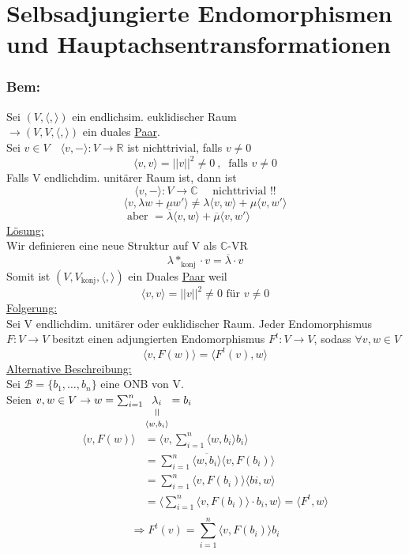 \documentclass[titlepage,12pt,a4paper,ngerman]{report}
\newcommand{\verteq}{\rotatebox{90}{$\,=$}}
\newcommand{\equalto}[2]{\underset{\scriptstyle\overset{\mkern4mu\verteq}{#2}}{#1}}
\newcommand{\tx}[1]{\textrm{#1}}
\begin{document}
\section{Selbsadjungierte Endomorphismen und Hauptachsentransformationen}
\subsubsection{Bem:}
Sei $ (V, \langle , \rangle) $ ein endlichsim. euklidischer Raum\\
$ \rightarrow (V,V,\langle,\rangle)$ ein duales \underline{Paar}.\\
Sei $ v\in V \quad \langle v, - \rangle : V \to \mathbb{R} $ ist nichttrivial, falls $ v \neq 0 $
$$ \langle v,v \rangle = ||v||^2 \neq 0\ , \ \tx{ falls } v \neq 0$$
Falls V endlichdim. unitärer Raum ist, dann ist 
$$ \langle v,-\rangle : V \to \mathbb{C} \quad \tx{ nichttrivial !!} $$
$$ \langle v, \lambda w + \mu w' \rangle \neq \lambda \langle v,w \rangle + \mu \langle v, w' \rangle$$
$$ \tx{aber } = \overline{\lambda} \langle v,w \rangle + \overline{\mu} \langle v, w'\rangle \qquad \quad $$
\underline{Lösung:}\\
Wir definieren eine neue Struktur auf V als $ \mathbb{C} $-VR
$$ \lambda *_{\tx{konj}} \cdot v = \overline{\lambda} \cdot v $$
Somit ist $ (V,V_{\tx{konj}}, \langle,\rangle) $ ein Duales \underline{Paar} weil 
$$ \langle v,v \rangle = ||v||^2 \neq 0 \tx{ für } v \neq 0$$
\underline{Folgerung:}\\
Sei V endlichdim. unitärer oder euklidischer Raum. Jeder Endomorphismus $ F: V \to V $ besitzt einen adjungierten Endomorphismus $ F^t: V \to V $, sodass $ \forall v,w \in V  $\\
$$ \langle v, F(w)\rangle = \langle F^t(v) , w \rangle$$
\underline{Alternative Beschreibung:}\\
Sei $ \mathcal{B}= \{b_1,\dots , b_n  \} $ eine ONB von V.\\
Seien $ v,w \in V \rightarrow w = \sum_{i=1}^{n} \equalto{\lambda _i}{\langle w, b_i \rangle} = b_i $
\begin{align*}
\langle v, F(w) \rangle &= \langle v , \sum_{i=1}^{n} \langle w, b_i \rangle b_i \rangle\\
&= \sum_{i=1}^{n} \overline{ \langle w, b_i \rangle } \langle v, F(b_i) \rangle \\
&= \sum_{i=1}^{n} \langle v, F(b_i) \rangle \langle bi , w \rangle\\
&= \langle \sum_{i=1}^{n} \langle v, F(b_i)\rangle \cdot b_i , w \rangle = \langle F^t, w \rangle\\
\end{align*}
$$ \Rightarrow F^t(v) = \sum_{i=1}^{n} \langle v, F(b_i)\rangle b_i$$
\end{document}
